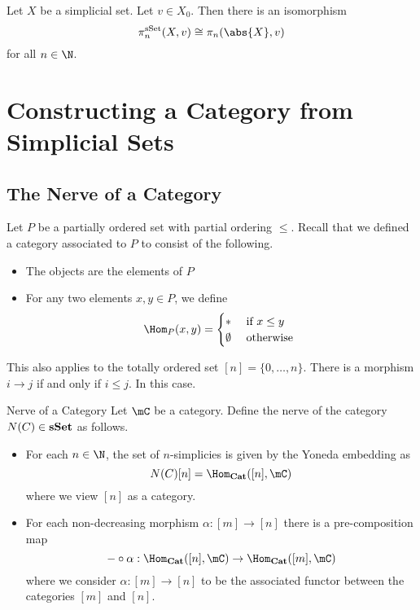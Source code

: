 \documentclass[a4paper]{article}
\begin{document}
\begin{thm}{}{} Let $X$ be a simplicial set. Let $v\in X_0$. Then there is an isomorphism $$\pi_n^\text{sSet}(X,v)\cong\pi_n(\abs{X},v)$$ for all $n\in\N$. 
\end{thm}

\pagebreak
\section{Constructing a Category from Simplicial Sets}
\subsection{The Nerve of a Category}
Let $P$ be a partially ordered set with partial ordering $\leq$. Recall that we defined a category associated to $P$ to consist of the following. 
\begin{itemize}
\item The objects are the elements of $P$
\item For any two elements $x,y\in P$, we define $$\Hom_P(x,y)=\begin{cases}
\ast & \text{ if }x\leq y\\
\emptyset & \text{ otherwise }
\end{cases}$$
\end{itemize}

This also applies to the totally ordered set $[n]=\{0,\dots,n\}$. There is a morphism $i\to j$ if and only if $i\leq j$. In this case. 

\begin{defn}{Nerve of a Category}{} Let $\mC$ be a category. Define the nerve of the category $N(C)\in\bold{sSet}$ as follows. 
\begin{itemize}
\item For each $n\in\N$, the set of $n$-simplicies is given by the Yoneda embedding as $$N(C)[n]=\Hom_\bold{Cat}([n],\mC)$$ where we view $[n]$ as a category. 
\item For each non-decreasing morphism $\alpha:[m]\to[n]$ there is a pre-composition map $$-\circ\alpha:\Hom_\bold{Cat}([n],\mC)\to\Hom_\bold{Cat}([m],\mC)$$ where we consider $\alpha:[m]\to[n]$ to be the associated functor between the categories $[m]$ and $[n]$. 
\end{itemize}
\end{defn}
\end{document}
